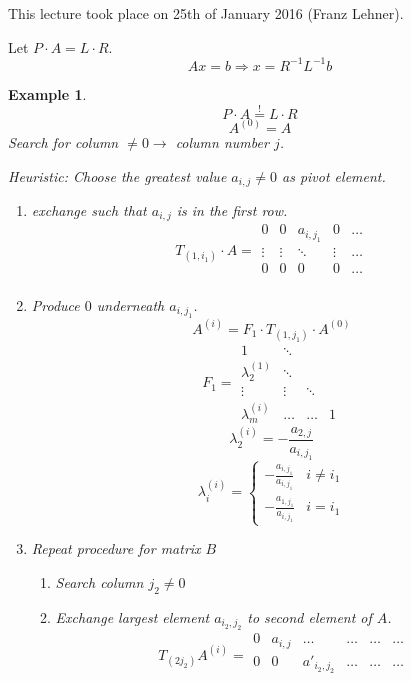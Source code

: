 \documentclass[a4paper,landscape,twocolumn]{article}
\newcommand\meta[3]{This #1 took place on #2 (#3).\par}
\newtheorem{ex}{Example}
\begin{document}
\meta{lecture}{25th of January 2016}{Franz Lehner}
%
Let $P \cdot A = L \cdot R$.
\[ Ax = b \Rightarrow x = R^{-1} L^{-1} b \]

\begin{ex}
  \label{ex-6.49}
  \[ P \cdot A \overset{!}{=} L \cdot R \]
  \[ A^{(0)} = A \]
  Search for column $\neq 0 \rightarrow$ column number $j$.

  Heuristic: Choose the greatest value $a_{i,j} \neq 0$ as pivot element.
  \begin{enumerate}
    \item exchange such that $a_{i,j}$ is in the first row.
      \[
        T_{(1,i_1)} \cdot A = \begin{matrix}
          0 & 0 & a_{i,j_1} & 0 & \ldots \\
          \vdots & \vdots & \ddots & \vdots & \ldots \\
          0 & 0 & 0 & 0 & \ldots \\
        \end{matrix}
      \]
    \item Produce $0$ underneath $a_{i,j_1}$.
      \[ A^{(i)} = F_1 \cdot T_{(1,j_1)} \cdot A^{(0)} \]
      \[
        F_1 = \begin{matrix}
          1 & \ddots &   &   \\
          \lambda_2^{(1)} & \ddots & & \\
          \vdots & \vdots & \ddots & \\
          \lambda_m^{(i)} & \ldots & \ldots & 1
        \end{matrix}
      \]
      \[ \lambda_2^{(i)} = -\frac{a_{2,j}}{a_{i,j_1}} \]
      \[
        \lambda_i^{(i)} = \begin{cases}
          -\frac{a_{i,j_1}}{a_{i,j_1}} & i \neq i_1 \\
          -\frac{a_{1,j_1}}{a_{i,j_1}} & i = i_1
        \end{cases}
      \]
    \item Repeat procedure for matrix $B$
      \begin{enumerate}
        \item Search column $j_2 \neq 0$
        \item Exchange largest element $a_{i_2, j_2}$ to second element of $A$.
          \[
            T_{(2 j_2)} A^{(i)} =
            \begin{matrix}
              0 & a_{i,j} & \ldots & \ldots & \ldots & \ldots \\
              0 & 0 & a'_{i_2,j_2} & \ldots & \ldots & \ldots \\

\end{matrix}\]
\end{enumerate}
\end{enumerate}
\end{ex}
\end{document}
